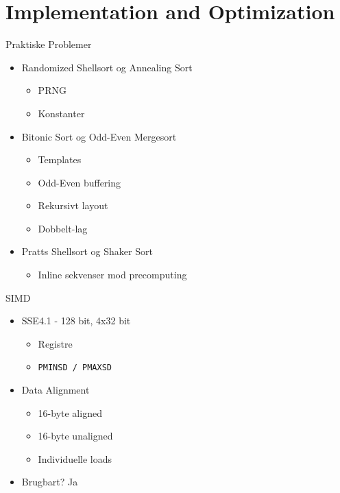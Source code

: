 
\section{Implementation and Optimization}

\begin{frame}{Praktiske Problemer}
	\begin{itemize}
		\item Randomized Shellsort og Annealing Sort
			\begin{itemize}
				\item PRNG
				\item Konstanter
			\end{itemize}
		\item Bitonic Sort og Odd-Even Mergesort
			\begin{itemize}
				\item Templates
				\item Odd-Even buffering
				\item Rekursivt layout
				\item Dobbelt-lag
			\end{itemize}
		\item Pratts Shellsort og Shaker Sort
			\begin{itemize}
				\item Inline sekvenser mod precomputing
			\end{itemize}
	\end{itemize}
\end{frame}

\begin{frame}{SIMD}
	\begin{itemize}
		\item SSE4.1 - 128 bit, 4x32 bit
			\begin{itemize}
				\item Registre
				\item \texttt{PMINSD / PMAXSD}
			\end{itemize}
		\item Data Alignment
			\begin{itemize}
				\item 16-byte aligned
				\item 16-byte unaligned
				\item Individuelle loads
			\end{itemize}
		\item Brugbart? Ja
	\end{itemize}
\end{frame}

